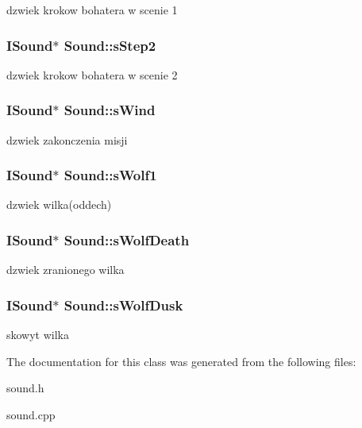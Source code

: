 dzwiek krokow bohatera w scenie 1 \hypertarget{class_sound_a4aa97616ede6628f495c5f5f8232b221}{
\subsubsection[{sStep2}]{\setlength{\rightskip}{0pt plus 5cm}ISound$\ast$ {\bf Sound::sStep2}}}
\label{class_sound_a4aa97616ede6628f495c5f5f8232b221}
dzwiek krokow bohatera w scenie 2 \hypertarget{class_sound_adc9fced45ebb6ce269c9b1b7df5d3714}{
\subsubsection[{sWind}]{\setlength{\rightskip}{0pt plus 5cm}ISound$\ast$ {\bf Sound::sWind}}}
\label{class_sound_adc9fced45ebb6ce269c9b1b7df5d3714}
dzwiek zakonczenia misji \hypertarget{class_sound_a3bc73aabde333948c2bf601bcfd95d71}{
\subsubsection[{sWolf1}]{\setlength{\rightskip}{0pt plus 5cm}ISound$\ast$ {\bf Sound::sWolf1}}}
\label{class_sound_a3bc73aabde333948c2bf601bcfd95d71}
dzwiek wilka(oddech) \hypertarget{class_sound_a1cf6c953b556197d1e2d63d45af02945}{
\subsubsection[{sWolfDeath}]{\setlength{\rightskip}{0pt plus 5cm}ISound$\ast$ {\bf Sound::sWolfDeath}}}
\label{class_sound_a1cf6c953b556197d1e2d63d45af02945}
dzwiek zranionego wilka \hypertarget{class_sound_a68f6b3a4aba5ab4324f8f20f5b4a653f}{
\subsubsection[{sWolfDusk}]{\setlength{\rightskip}{0pt plus 5cm}ISound$\ast$ {\bf Sound::sWolfDusk}}}
\label{class_sound_a68f6b3a4aba5ab4324f8f20f5b4a653f}
skowyt wilka 

The documentation for this class was generated from the following files:\begin{DoxyCompactItemize}
\item 
sound.h\item 
sound.cpp\end{DoxyCompactItemize}

